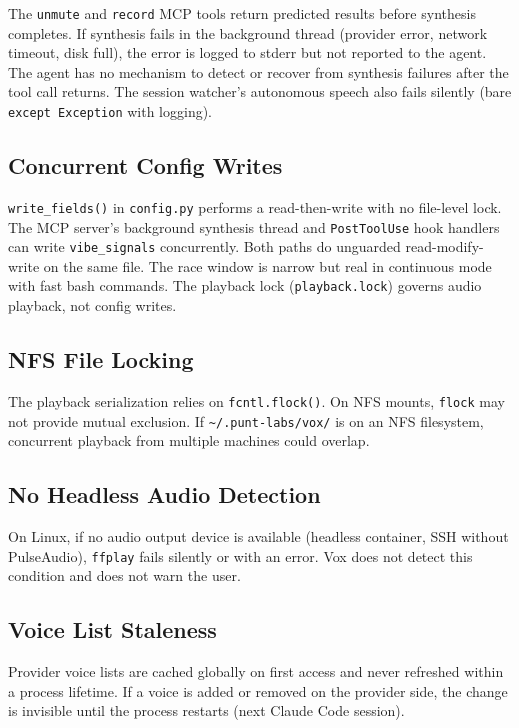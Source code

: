 \documentclass[a4paper,10pt]{article}
\newcommand{\tool}[1]{\texttt{#1}}
\newcommand{\field}[1]{\texttt{#1}}
\newcommand{\hook}[1]{\texttt{#1}}
\begin{document}
The \tool{unmute} and \tool{record} MCP tools return predicted
results before synthesis completes.  If synthesis fails in the
background thread (provider error, network timeout, disk full),
the error is logged to stderr but not reported to the agent.  The
agent has no mechanism to detect or recover from synthesis
failures after the tool call returns.  The session watcher's
autonomous speech also fails silently (bare
\texttt{except Exception} with logging).

\subsection{Concurrent Config Writes}

\texttt{write\_fields()} in \texttt{config.py} performs a
read-then-write with no file-level lock.  The MCP server's
background synthesis thread and \hook{PostToolUse} hook handlers
can write \field{vibe\_signals} concurrently.  Both paths do
unguarded read-modify-write on the same file.  The race window
is narrow but real in continuous mode with fast bash commands.
The playback lock (\texttt{playback.lock}) governs audio
playback, not config writes.

\subsection{NFS File Locking}

The playback serialization relies on \texttt{fcntl.flock()}.  On
NFS mounts, \texttt{flock} may not provide mutual exclusion.  If
\texttt{\~{}/.punt-labs/vox/} is on an NFS filesystem, concurrent
playback from multiple machines could overlap.

\subsection{No Headless Audio Detection}

On Linux, if no audio output device is available (headless
container, SSH without PulseAudio), \texttt{ffplay} fails
silently or with an error.  Vox does not detect this condition
and does not warn the user.

\subsection{Voice List Staleness}

Provider voice lists are cached globally on first access and
never refreshed within a process lifetime.  If a voice is added
or removed on the provider side, the change is invisible until
the process restarts (next Claude Code session).
\end{document}
